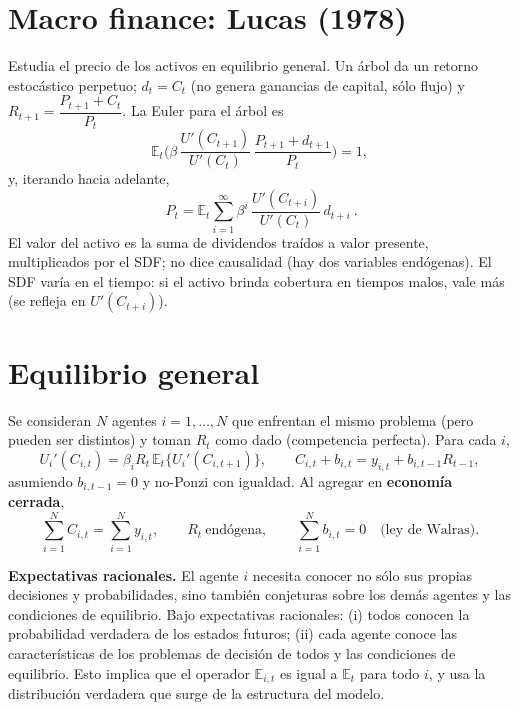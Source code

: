 \documentclass[11pt]{article}
\renewcommand{\boxed}[1]{#1}     %
\theoremstyle{definition}
\newcommand{\E}{\mathbb{E}}
\begin{document}
\section{Macro finance: Lucas (1978)}

Estudia el precio de los activos en equilibrio general. Un árbol da un retorno estocástico perpetuo;
$d_{t}=C_{t}$ (no genera ganancias de capital, sólo flujo) y $R_{t+1}=\dfrac{P_{t+1}+C_{t}}{P_{t}}$.
La Euler para el árbol es
\begin{equation}
\E_{t}\!\Big(\beta\,\frac{U'(C_{t+1})}{U'(C_{t})}\,\frac{P_{t+1}+d_{t+1}}{P_{t}}\Big)=1,
\end{equation}
y, iterando hacia adelante,
\begin{equation}
\boxed{\ P_{t}=\E_{t}\sum_{i=1}^{\infty}\beta^{i}\,\frac{U'(C_{t+i})}{U'(C_{t})}\,d_{t+i}\ }.
\end{equation}
El valor del activo es la suma de dividendos traídos a valor presente, multiplicados por el SDF; no
dice causalidad (hay dos variables endógenas). El SDF varía en el tiempo: si el activo brinda
cobertura en tiempos malos, vale más (se refleja en $U'(C_{t+i})$).

\section{Equilibrio general}

Se consideran $N$ agentes $i=1,\dots,N$ que enfrentan el mismo problema (pero pueden ser distintos)
y toman $R_{t}$ como dado (competencia perfecta). Para cada $i$,
\begin{equation}
U_{i}'(C_{i,t})=\beta_{i}R_{t}\,\E_{t}\{U_{i}'(C_{i,t+1})\},
\qquad
C_{i,t}+b_{i,t}=y_{i,t}+b_{i,t-1}R_{t-1},
\end{equation}
asumiendo $b_{i,t-1}=0$ y no-Ponzi con igualdad. Al agregar en \textbf{economía cerrada},
\begin{equation}
\sum_{i=1}^{N}C_{i,t}=\sum_{i=1}^{N}y_{i,t},
\qquad R_{t}\ \text{endógena},
\qquad \sum_{i=1}^{N}b_{i,t}=0\quad\text{(ley de Walras).}
\end{equation}

\textbf{Expectativas racionales.} El agente $i$ necesita conocer no sólo sus propias decisiones y
probabilidades, sino también conjeturas sobre los demás agentes y las condiciones de equilibrio.
Bajo expectativas racionales: (i) todos conocen la probabilidad verdadera de los estados futuros;
(ii) cada agente conoce las características de los problemas de decisión de todos y las condiciones
de equilibrio. Esto implica que el operador $\E_{i,t}$ es igual a $\E_{t}$ para todo $i$, y usa la
distribución verdadera que surge de la estructura del modelo.
\end{document}
